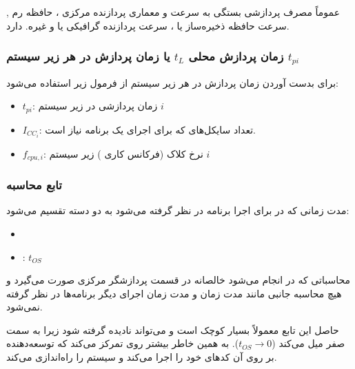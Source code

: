 عموماً مصرف پردازشی بستگی به سرعت و معماری پردازنده مرکزی ، حافظه رم
, سرعت حافظه ذخیره‌ساز  یا ، سرعت پردازنده گرافیکی
یا  و غیره. دارد.

\subsubsection{زمان پردازش محلی $t_L$ یا زمان پردازش در هر زیر سیستم $t_{pi}$}

برای بدست آوردن زمان پردازش در هر زیر سیستم از فرمول زیر استفاده می‌شود:


\begin{itemize}
    \item $t_{pi}$: زمان پردازشی در زیر سیستم $i$
    \item $I_{CC_i}$: تعداد سایکل‌های  که برای اجرای یک برنامه نیاز است.
    \item $f_{cpu, i}$: نرخ کلاک (فرکانس کاری ) زیر سیستم $i$
\end{itemize}


\subsubsection{تابع محاسبه }

مدت زمانی که در  برای اجرا برنامه در نظر گرفته می‌شود به دو دسته تقسیم می‌شود:

\begin{LTR}
    \begin{itemize}
        \item {}
        \item {}: $t_{OS}$
    \end{itemize}
\end{LTR}

محاسباتی که در  انجام می‌شود خالصانه در قسمت پردازشگر مرکزی صورت
می‌گیرد و هیچ محاسبه جانبی مانند مدت زمان  و مدت زمان اجرای دیگر
برنامه‌ها در نظر گرفته نمی‌شود.


حاصل این تابع معمولاً بسیار کوچک است و می‌تواند نادیده گرفته شود زیرا به سمت صفر
میل می‌کند ($t_{OS} \rightarrow 0$). به همین خاطر بیشتر روی 
تمرکز می‌کند که توسعه‌دهنده بر روی آن کد‌های خود را اجرا می‌کند و سیستم 
را راه‌اندازی می‌کند.

